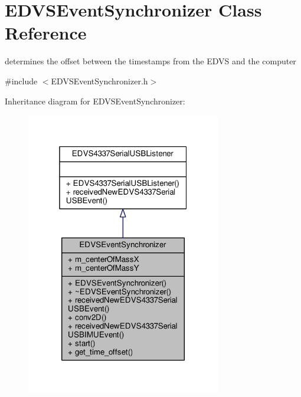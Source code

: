 \hypertarget{class_e_d_v_s_event_synchronizer}{}\section{E\+D\+V\+S\+Event\+Synchronizer Class Reference}
\label{class_e_d_v_s_event_synchronizer}


determines the offset between the timestamps from the E\+D\+V\+S and the computer  




{\ttfamily \#include $<$E\+D\+V\+S\+Event\+Synchronizer.\+h$>$}



Inheritance diagram for E\+D\+V\+S\+Event\+Synchronizer\+:
\nopagebreak
\begin{figure}[H]
\begin{center}
\leavevmode
\includegraphics[width=241pt]{class_e_d_v_s_event_synchronizer__inherit__graph}
\end{center}
\end{figure}


